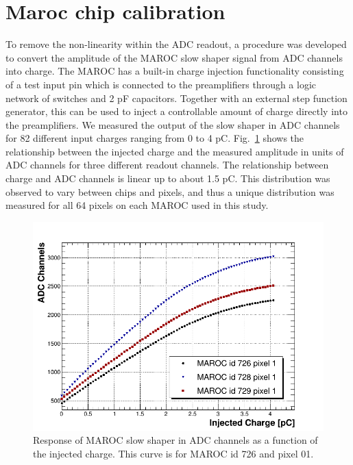 \section{Maroc chip calibration}

To remove the non-linearity within the ADC readout, a procedure was developed to convert the amplitude of the MAROC slow shaper signal from ADC channels into charge. The MAROC has a built-in charge injection functionality consisting of a test input pin which is connected to the preamplifiers through a logic network of switches and 2 pF capacitors. Together with an external step function generator, this can be used to inject a controllable amount of charge directly into the preamplifiers. We measured the output of the slow shaper in ADC channels for 82 different input charges ranging from 0 to 4 pC. Fig.~\ref{fig:MAROCcalib} shows the relationship between the injected charge and the measured amplitude in units of ADC channels for three different readout channels. The relationship between charge and ADC channels is linear up to about 1.5 pC. This distribution was observed to vary between chips and pixels, and thus a unique distribution was measured for all 64 pixels on each MAROC used in this study. 

\begin{figure}[hbt]
	\centering
	\includegraphics[width=\linewidth]{figures/adc_v_charge.png}
	\caption{Response of MAROC slow shaper in ADC channels as a function of the injected charge. This curve is for MAROC id 726 and pixel 01.}
	\label{fig:MAROCcalib}
\end{figure}

